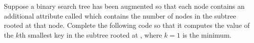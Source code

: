 \begin{prob}
    Suppose a binary search tree has been augmented so that each node contains an
    additional attribute called  which contains the number of nodes
    in the subtree rooted at that node. Complete the following code
    so that it computes the value of the $k$th smallest key in the subtree
    rooted at , where $k = 1$ is the minimum.

    \inputminted{python}{\thisdir/include/order_statistic.py}

    \begin{soln}
    \end{soln}
\end{prob}
